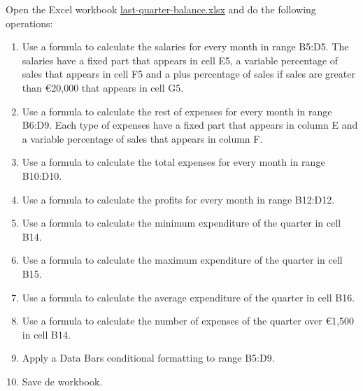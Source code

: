 \begin{enumerate}[leftmargin=*,resume]
Open the Excel workbook
\href{http://aprendeconalf.es/office/excel/exercises/formulas/last-quarter-balance.xlsx}{\textsf{last-quarter-balance.xlsx}}
and do the following operations:

\begin{enumerate}
\item Use a formula to calculate the salaries for every month in range B5:D5. The salaries have a fixed part that
appears in cell E5, a variable percentage of sales that appears in cell F5 and a plus percentage of sales if sales are greater than €20,000
that appears in cell G5.
\item Use a formula to calculate the rest of expenses for every month in range B6:D9. Each type of expenses have a fixed
part that appears in column E and a variable percentage of sales that appears in column F. 
\item Use a formula to calculate the total expenses for every month in range B10:D10. 
\item Use a formula to calculate the profits for every month in range B12:D12.
\item Use a formula to calculate the minimum expenditure of the quarter in cell B14.
\item Use a formula to calculate the maximum expenditure of the quarter in cell B15.
\item Use a formula to calculate the average expenditure of the quarter in cell B16.
\item Use a formula to calculate the number of expenses of the quarter over €1,500 in cell B14.
\item Apply a Data Bars conditional formatting to range B5:D9.
\item Save de workbook.
\end{enumerate}


\end{enumerate}
